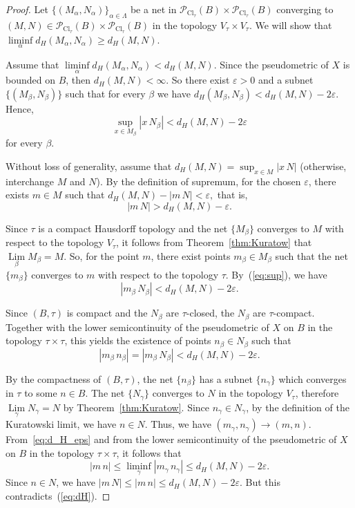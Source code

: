 \documentclass{svproc}
\def\Cl{\operatorname{Cl}}
\def\Lim{\operatorname{Lim}}
\begin{document}
\begin{proof}

Let $\bigl\{(M_{\alpha}, N_{\alpha})\bigr\}_{\alpha\in \Lambda}$ be a net in $\mathcal{P}_{\Cl_{\tau}}(B)\times \mathcal{P}_{\Cl_{\tau}}(B)$ converging to $(M, N)\in \mathcal{P}_{\Cl_{\tau}}(B)\times \mathcal{P}_{\Cl_{\tau}}(B)$ in the topology $V_{\tau}\times V_{\tau}$. We will show that $\liminf\limits_{\alpha} d_H(M_{\alpha}, N_{\alpha})\ge d_H(M, N).$

Assume that $\liminf\limits_{\alpha} d_H(M_{\alpha}, N_{\alpha}) < d_H(M, N)$. Since the pseudometric of $X$ is bounded on $B$, then $d_H(M, N) < \infty$. So there exist $\varepsilon > 0$ and a subnet $\bigl\{(M_{\beta}, N_{\beta})\bigr\}$ such that for every $\beta$ we have $d_H(M_{\beta}, N_{\beta}) < d_H(M, N) - 2\varepsilon.$ Hence,
\begin{equation}\label{eq:sup}
\sup_{x\in M_{\beta}} |x\, N_{\beta}| < d_H(M, N) - 2\varepsilon
\end{equation}
for every $\beta$.

Without loss of generality, assume that $d_H(M, N) = \sup_{x\in M} |x\, N|$ (otherwise, interchange $M$ and $N$). By the definition of supremum, for the chosen $\varepsilon$, there exists $m\in M$ such that $d_H(M, N) - |m\, N| < \varepsilon,$ that is,
\begin{equation}\label{eq:dH}
|m\, N| > d_H(M, N) - \varepsilon.
\end{equation}

Since $\tau$ is a compact Hausdorff topology and the net $\{M_{\beta}\}$ converges to $M$ with respect to the topology $V_{\tau}$, it follows from Theorem~\ref{thm:Kuratow} that $\Lim\limits_{\beta} M_{\beta} = M$. So, for the point $m$, there exist points $m_{\beta}\in M_{\beta}$ such that the net $\{m_{\beta}\}$ converges to $m$ with respect to the topology $\tau$. By~(\ref{eq:sup}), we have
$$|m_{\beta}\, N_{\beta}| < d_H(M, N) - 2\varepsilon.$$

Since $(B, \tau)$ is compact and the $N_{\beta}$ are $\tau$-closed, the $N_{\beta}$ are $\tau$-compact. Together with the lower semicontinuity of the pseudometric of $X$ on $B$ in the topology $\tau\times \tau$, this yields the existence of points $n_{\beta}\in N_{\beta}$ such that
\begin{equation}\label{eq:d_H_eps}
|m_{\beta}\, n_{\beta}| = |m_{\beta}\, N_{\beta}| < d_H(M, N) - 2\varepsilon.
\end{equation}

By the compactness of $(B, \tau)$, the net $\{n_{\beta}\}$ has a subnet $\{n_{\gamma}\}$ which converges in $\tau$ to some $n\in B$. The net $\{N_{\gamma}\}$ converges to $N$ in the topology $V_{\tau}$, therefore $\Lim\limits_{\gamma} N_{\gamma} = N$ by Theorem~\ref{thm:Kuratow}. Since $n_{\gamma}\in N_{\gamma}$, by the definition of the Kuratowski limit, we have $n\in N$. Thus, we have $(m_{\gamma}, n_{\gamma})\to (m, n)$. From~\eqref{eq:d_H_eps} and from the lower semicontinuity of the pseudometric of $X$ on $B$ in the topology $\tau\times \tau$, it follows that
$$|m\, n|\le \liminf\limits_{\gamma} |m_{\gamma}\, n_{\gamma}| \le d_H(M, N) - 2\varepsilon.$$
Since $n\in N$, we have $|m\, N|\le |m\, n|\le d_H(M, N) - 2\varepsilon.$
But this contradicts~(\ref{eq:dH}).


\end{proof}
\end{document}
